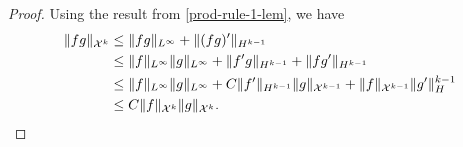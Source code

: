 \prodruletwo*
\begin{proof}
	Using the result from \cref{prod-rule-1-lem}, we have 
	\begin{equation}
	\begin{aligned}
		\| f g \|_{\mathcal{X}^k} &\leq \| f g\|_{L^\infty} + \| (fg)' \|_{H^{k-1}} \\
		&\leq \|f \|_{L^\infty} \| g \|_{L^\infty} + \|f'g \|_{H^{k-1}} + \| fg' \|_{H^{k-1}} \\
		&\leq \|f \|_{L^\infty} \| g \|_{L^\infty} + C\|f'\|_{H^{k-1}} \|g \|_{\mathcal{X}^{k-1}} + \| f \|_{\mathcal{X}^{k-1}} \|g'\|_H^{k-1} \\
		&\leq C \|f \|_{\mathcal{X}^k} \|g\|_{\mathcal{X}^k} .
	\end{aligned}
	\end{equation}
\end{proof}

